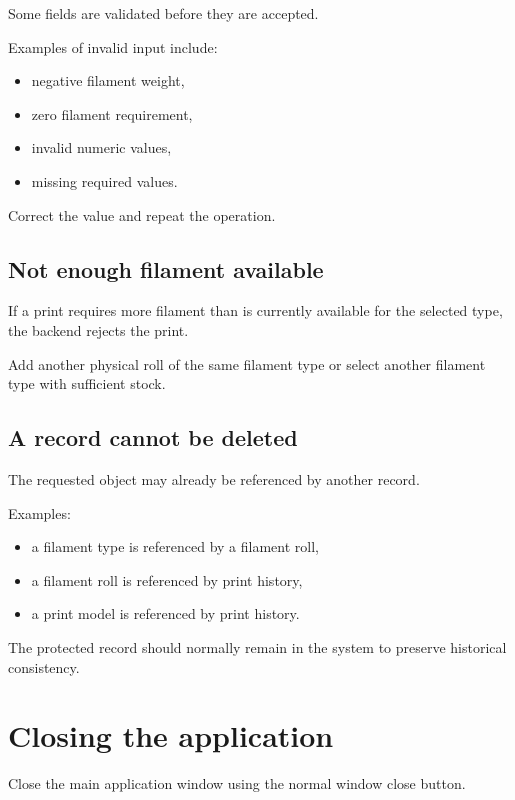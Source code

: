 \documentclass[a4paper,11pt]{article}
\begin{document}
Some fields are validated before they are accepted.

Examples of invalid input include:

\begin{itemize}
  \item negative filament weight,
  \item zero filament requirement,
  \item invalid numeric values,
  \item missing required values.
\end{itemize}

Correct the value and repeat the operation.

\subsection{Not enough filament available}

If a print requires more filament than is currently available for the
selected type, the backend rejects the print.

Add another physical roll of the same filament type or select another
filament type with sufficient stock.

\subsection{A record cannot be deleted}

The requested object may already be referenced by another record.

Examples:

\begin{itemize}
  \item a filament type is referenced by a filament roll,
  \item a filament roll is referenced by print history,
  \item a print model is referenced by print history.
\end{itemize}

The protected record should normally remain in the system to preserve
historical consistency.

\section{Closing the application}

Close the main application window using the normal window close button.
\end{document}
